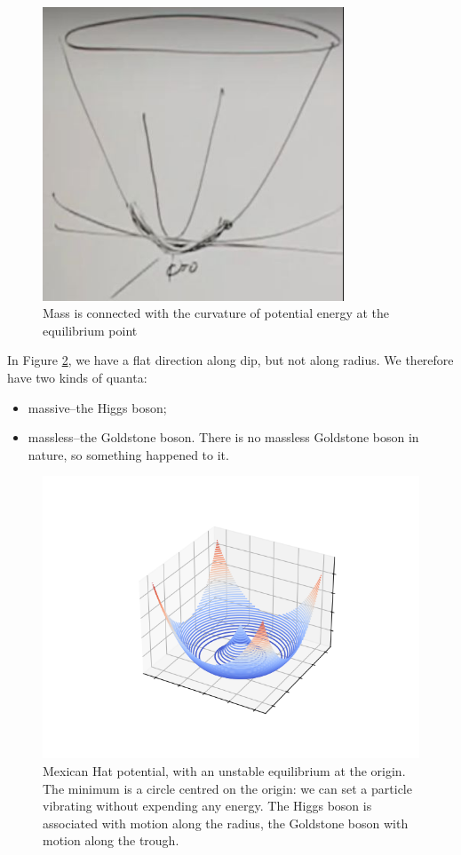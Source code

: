 \documentclass[]{article}
\begin{document}
\begin{figure}[H]
	\caption{Mass is connected with the curvature of potential energy at the equilibrium point}\label{fig:2-8-pe}
	\includegraphics[width=0.8\textwidth]{2-8-pe}
\end{figure}

In Figure \ref{fig:mexican-hat}, we have a flat direction along dip, but not along radius. We therefore have two kinds of quanta:
\begin{itemize}
	\item massive--the Higgs boson;
	\item massless--the Goldstone boson. There is no massless Goldstone boson in nature, so something happened to it.
\end{itemize}

\begin{figure}[H]
	\begin{center}
		\caption[Mexican Hat potential]{Mexican Hat potential, with an unstable equilibrium at the origin.  The minimum is a circle centred on the origin: we can set a particle vibrating without expending any energy. The Higgs boson is associated with motion along the radius, the Goldstone boson with motion along the trough.}\label{fig:mexican-hat}
		\includegraphics[width=\textwidth]{mexican-hat}
	\end{center}
\end{figure}
\end{document}
